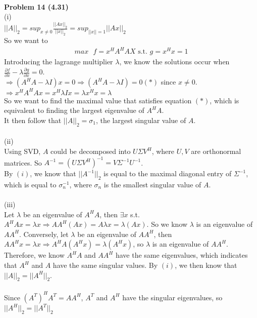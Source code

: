 \documentclass[letterpaper,12pt]{article}
\theoremstyle{definition}
\begin{document}
\\
\noindent\textbf{Problem 14 (4.31)} \\
(i)\\
$||A||_2 = sup_{x\neq 0}\frac{||Ax||_2}{||x||_2} = sup_{||x||=1}||Ax||_2$\\
So we want to 
\begin{align*}
max\text{  }f = x^HA^HAX \text{ s.t. } g = x^Hx = 1
\end{align*}
Introducing the lagrange multiplier $\lambda$, we know the solutions occur when $\frac{\partial f}{\partial x} - \lambda\frac{\partial g}{\partial x} = 0$.\\
$\Rightarrow (A^HA-\lambda I)x = 0\Rightarrow (A^HA- \lambda I) = 0 (*)$ since $x \neq 0$.\\
$\Rightarrow x^HA^HAx = x^H\lambda I x = \lambda x^H x = \lambda$\\
So we want to find the maximal value that satisfies equation $(*)$, which is equivalent to finding the largest eigenvalue of $A^HA.$\\
It then follow that $||A||_2 = \sigma_1$, the largest singular value of $A$.\\
\\
(ii)\\
Using SVD, $A$ could be decomposed into $U\Sigma V^H$, where $U, V$ are orthonormal matrices. So $A^{-1} = (U\Sigma V^H)^{-1} = V\Sigma^{-1}U^{-1}$.\\
By $(i)$, we know that $||A^{-1}||_2$ is equal to the maximal diagonal entry of $\Sigma^{-1}$, which is equal to $\sigma_n^{-1}$, where $\sigma_n$ is the smallest singular value of $A$.\\
\\
(iii)\\
Let $\lambda$ be an eigenvalue of $A^HA$, then $\exists x$ s.t. $A^HAx = \lambda x \Rightarrow AA^H(Ax) = A\lambda x = \lambda (Ax)$. So we know $\lambda$ is an eigenvalue of $AA^H$. Conversely, let $\lambda$ be an eigenvalue of $AA^H$, then $AA^Hx = \lambda x\Rightarrow A^HA(A^Hx) = \lambda (A^Hx)$, so $\lambda$ is an eigenvalue of $AA^H$.\\
Therefore, we know $A^HA$ and $AA^H$ have the same eigenvalues, which indicates that $A^H$ and $A$ have the same singular values. By $(i)$, we then know that $||A||_2 = ||A^H||_2$.\\
\\
Since $(A^T)^H A^T = AA^H$, $A^T$ and $A^H$ have the singular eigenvalues, so $||A^H||_2 = ||A^T||_2$\\
\\
\end{document}
